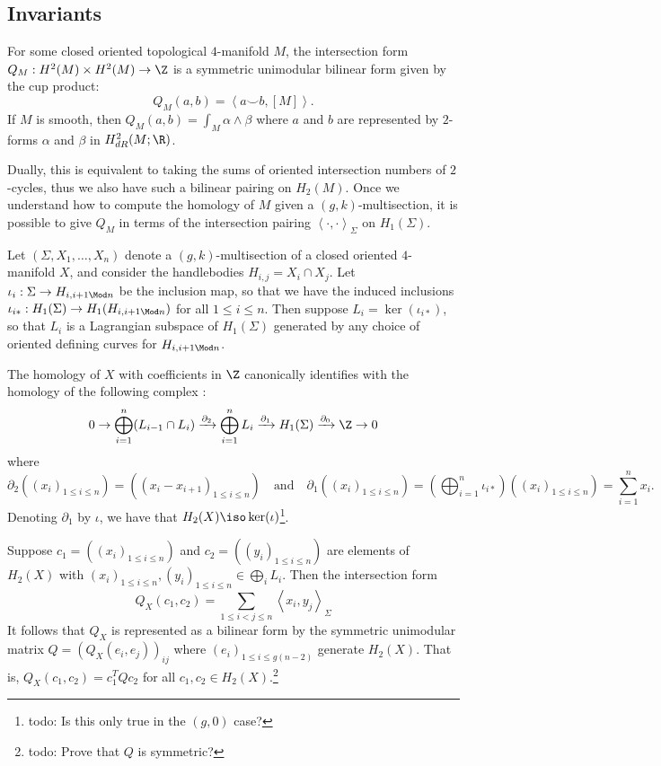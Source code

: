 \subsection{Invariants}

\begin{definition}
	For some closed oriented topological $4$-manifold $M$, the intersection form $Q_M: H^2(M) \times H^2(M) \to \Z$ is a symmetric unimodular bilinear form given by the cup product: \[Q_M(a,b) = \left< a \smile b, [M] \right>.\] If $M$ is smooth, then $Q_M(a,b) = \int_M \alpha \wedge \beta$ where $a$ and $b$ are represented by $2$-forms $\alpha$ and $\beta$ in $H^2_{dR}(M;\R)$. 
\end{definition}

Dually, this is equivalent to taking the sums of oriented intersection numbers of $2$-cycles, thus we also have such a bilinear pairing on $H_2(M)$. Once we understand how to compute the homology of $M$ given a $(g,k)$-multisection, it is possible to give $Q_M$ in terms of the intersection pairing $\left< \cdot,\cdot \right>_{\Sigma}$ on $H_1(\Sigma)$.

Let $(\Sigma,X_1,\dots,X_n)$ denote a $(g,k)$-multisection of a closed oriented $4$-manifold $X$, and consider the handlebodies $H_{i,j} = X_i \cap X_j$. Let $\iota_i: \Sigma \to H_{i,i+1\Mod n}$ be the inclusion map, so that we have the induced inclusions $\iota_{i*}: H_1(\Sigma) \to H_1(H_{i,i+1 \Mod n})$ for all $1 \leq i \leq n$. Then suppose $L_i = \ker(\iota_{i*})$, so that $L_i$ is a Lagrangian subspace of $H_1(\Sigma)$ generated by any choice of oriented defining curves for $H_{i,i+1 \Mod n}$. 

\begin{theorem}
	The homology of $X$ with coefficients in $\Z$ canonically identifies with the homology of the following complex \cite{Feller}:
	\[0 \to \bigoplus_{i = 1}^n (L_{i - 1} \cap L_i) \xrightarrow{\partial_2} \bigoplus_{i = 1}^n L_i \xrightarrow{\partial_1} H_1(\Sigma) \xrightarrow{\partial_0} \Z \to 0\]
	where \[\partial_2\left((x_i)_{1 \leq i \leq n}\right) = \left( (x_i - x_{i + 1})_{1 \leq i \leq n} \right) \quad \text{and} \quad \partial_1\left( (x_i)_{1 \leq i \leq n} \right) = \left(\bigoplus_{i = 1}^n \iota_{i*}\right)\left( (x_i)_{1 \leq i \leq n} \right) = \sum_{i = 1}^n x_i.\] Denoting $\partial_1$ by $\iota$, we have that $H_2(X) \iso \ker(\iota)$\footnote{todo: Is this only true in the $(g,0)$ case?}.
\end{theorem}

\begin{theorem}
	Suppose $c_1 = \left( (x_i)_{1 \leq i \leq n} \right)$ and $c_2 = \left( (y_i)_{1 \leq i \leq n} \right)$ are elements of $H_2(X)$ with $(x_i)_{1 \leq i \leq n},(y_i)_{1 \leq i \leq n} \in \bigoplus_{i} L_i$. Then the intersection form \[Q_X(c_1,c_2) = \sum_{1 \leq i < j \leq n} \left< x_i,y_j \right>_\Sigma\] It follows that $Q_X$ is represented as a bilinear form by the symmetric unimodular matrix $Q = \left(Q_X(e_i,e_j)\right)_{ij}$ where $(e_i)_{1 \leq i \leq g(n - 2)}$ generate $H_2(X)$. That is, $Q_X(c_1,c_2) = c_1^TQc_2$ for all $c_1,c_2 \in H_2(X)$.\footnote{todo: Prove that $Q$ is symmetric?}
\end{theorem}

